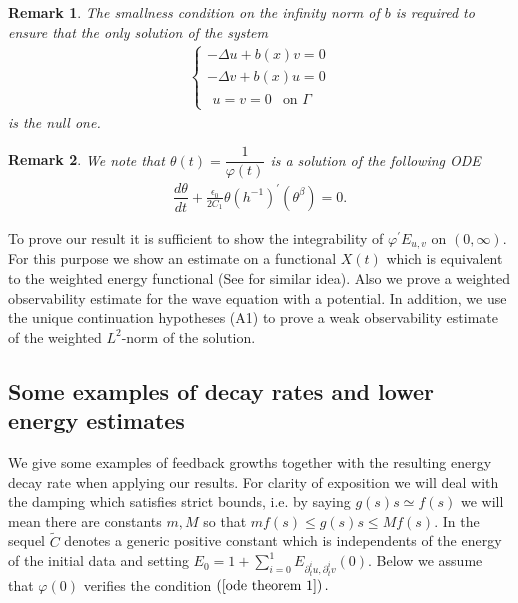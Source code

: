 \documentclass[11pt,reqno]{amsart}
\theoremstyle{plain}
\newtheorem{remark}{Remark}
\numberwithin{equation}{section}
\numberwithin{equation}{section}
\begin{document}
\begin{remark}
The smallness condition on the infinity norm of $b$ is required to ensure
that the only solution of the system 
\begin{equation}
\begin{array}{c}
\left\{ 
\begin{array}{l}
-\Delta u+b(x)v=0 \\ 
-\Delta v+b(x)u=0 \\ 
\begin{array}{ll}
u=v=0 & \text{on }\Gamma%
\end{array}%
\end{array}%
\right.%
\end{array}
\label{counterexample-utelda}
\end{equation}%
is the null one.
\end{remark}

\begin{remark}
We note that $\theta \left( t\right) =\dfrac{1}{\varphi \left( t\right) }$
is a solution of the following ODE%
\begin{equation}
\begin{array}{c}
\dfrac{d\theta }{dt}+\frac{\epsilon _{0}}{2C_{1}}\theta \left( h^{-1}\right)
^{\prime }\left( \theta ^{\beta }\right) =0.%
\end{array}
\label{one over phi ode}
\end{equation}
\end{remark}

To prove our result it is sufficient to show the integrability of $\varphi
^{\prime }E_{u,v}$ on $(0,\infty )$. For this purpose we show an estimate on
a functional $X(t)$ which is equivalent to the weighted energy functional
(See \cite{daou ext} for similar idea). Also we prove a weighted
observability estimate for the wave equation with a potential. In addition,
we use the unique continuation hypotheses (A1) to prove a weak observability
estimate of the weighted $L^{2}$-norm of the solution.

\subsection{Some examples of decay rates and lower energy estimates}

We give some examples of feedback growths together with the resulting energy
decay rate when applying our results. For clarity of exposition we will deal
with the damping which satisfies strict bounds, i.e. by saying $g(s)s\simeq
f(s)$ we will mean there are constants $m,M$ so that $mf(s)\leq g(s)s\leq
Mf(s)$. In the sequel $\tilde{C}$ denotes a generic positive constant which
is independents of the energy of the initial data and setting $%
E_{0}=1+\sum_{i=0}^{1}E_{\partial _{t}^{i}u,\partial _{t}^{i}v}\left(
0\right) $. Below we assume that $\varphi \left( 0\right) $ verifies the
condition $\left( \ref{ode theorem 1}\right) .$
\end{document}
